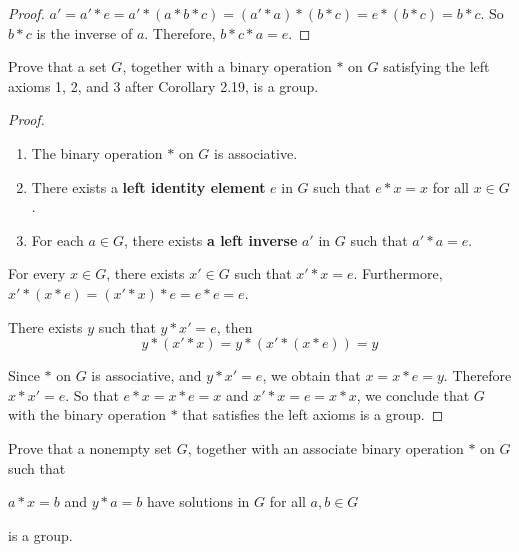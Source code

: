 \begin{proof}
    $a' = a' * e = a' * (a * b * c) = (a' * a) * (b * c) = e * (b * c) = b * c$. So $b * c$ is the inverse of $a$. Therefore, $b * c * a = e$.
\end{proof}

\begin{exercise}
    Prove that a set $G$, together with a binary operation $*$ on $G$ satisfying the left axioms 1, 2, and 3 after Corollary 2.19, is a group.
\end{exercise}

\begin{proof}
    \begin{enumerate}[label={\textbf{Axiom \arabic*.}},itemindent=1cm]
        \item The binary operation $*$ on $G$ is associative.
        \item There exists a \textbf{left identity element} $e$ in $G$ such that $e * x = x$ for all $x\in G$.
        \item For each $a\in G$, there exists \textbf{a left inverse} $a'$ in $G$ such that $a' * a = e$.
    \end{enumerate}

    For every $x\in G$, there exists $x'\in G$ such that $x' * x = e$. Furthermore, $x' * (x * e) = (x' * x) * e = e * e = e$.

    There exists $y$ such that $y * x' = e$, then
    \[
        y * (x' * x) = y * (x' * (x * e)) = y
    \]

    Since $*$ on $G$ is associative, and $y * x' = e$, we obtain that $x = x * e = y$. Therefore $x * x' = e$. So that $e * x = x * e = x$ and $x' * x = e = x * x$, we conclude that $G$ with the binary operation $*$ that satisfies the left axioms is a group.
\end{proof}

\begin{exercise}
    Prove that a nonempty set $G$, together with an associate binary operation $*$ on $G$ such that
    \begin{center}
        $a * x = b$ and $y * a = b$ have solutions in $G$ for all $a, b\in G$
    \end{center}

    is a group.
\end{exercise}

